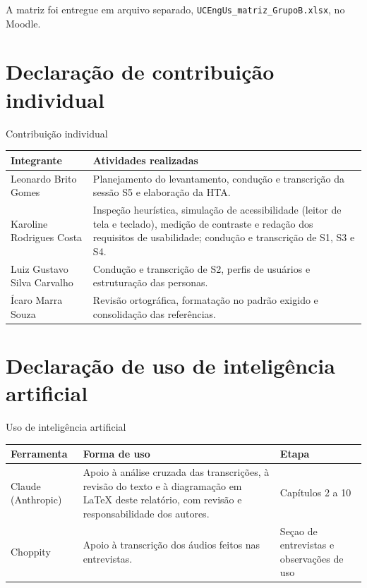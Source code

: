 \documentclass[
  12pt,
  oneside,
  a4paper,
  chapter=TITLE,
  section=TITLE,
  english,
  brazilian
]{abntex2}
\renewcommand{\fonte}[1]{\par\vspace{3pt}{\footnotesize\raggedright\noindent Fonte: #1\par}\vspace{4pt}}%
\begin{document}
A matriz foi entregue em arquivo separado,
\texttt{UCEngUs\_\allowbreak matriz\_\allowbreak Grupo{B}.xlsx}, no Moodle.

\chapter{Declaração de contribuição individual}\label{cap:contribuicao}

\begin{quadro}[!htbp]
  \caption{Contribuição individual}\label{qua:contribuicao}
  \centering\small
  \begin{tabularx}{\textwidth}{|P{3.4cm}|Y|}\hline
    Integrante & Atividades realizadas \\\hline
    Leonardo Brito Gomes & Planejamento do levantamento, condução e transcrição da sessão S5 e elaboração da HTA. \\\hline
    Karoline Rodrigues Costa & Inspeção heurística, simulação de acessibilidade (leitor de tela e teclado), medição de contraste e redação dos requisitos de usabilidade; condução e transcrição de S1, S3 e S4. \\\hline
    Luiz Gustavo Silva Carvalho & Condução e transcrição de S2, perfis de usuários e estruturação das personas. \\\hline
    Ícaro Marra Souza & Revisão ortográfica, formatação no padrão exigido e consolidação das referências. \\\hline
  \end{tabularx}
  \fonte{Elaborado pelos autores (2026).}
\end{quadro}

\chapter{Declaração de uso de inteligência artificial}\label{cap:ia}

\begin{quadro}[!htbp]
  \caption{Uso de inteligência artificial}\label{qua:ia}
  \centering\small
  \begin{tabularx}{\textwidth}{|P{3.4cm}|Y|P{2.4cm}|}\hline
    Ferramenta & Forma de uso & Etapa \\\hline
    Claude (Anthropic) & Apoio à análise cruzada das transcrições, à revisão do texto e à diagramação em \LaTeX{} deste relatório, com revisão e responsabilidade dos autores. & Capítulos 2 a 10 \\\hline
    Choppity & Apoio à transcrição dos áudios feitos nas entrevistas. & Seçao de entrevistas e observações de uso \\\hline
  \end{tabularx}
  \fonte{Elaborado pelos autores (2026).}
\end{quadro}
\end{document}
